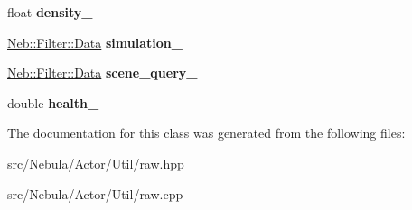 \begin{DoxyCompactItemize}
\item 
\hypertarget{classNeb_1_1Actor_1_1raw_a6f591c6a187022df38c021935f37652b}{float {\bfseries density\-\_\-}}\label{classNeb_1_1Actor_1_1raw_a6f591c6a187022df38c021935f37652b}

\item 
\hypertarget{classNeb_1_1Actor_1_1raw_a98277053503abc934fc98d68695ec5ce}{\hyperlink{classNeb_1_1Filter_1_1Data}{\-Neb\-::\-Filter\-::\-Data} {\bfseries simulation\-\_\-}}\label{classNeb_1_1Actor_1_1raw_a98277053503abc934fc98d68695ec5ce}

\item 
\hypertarget{classNeb_1_1Actor_1_1raw_a10f21229110140a267883a7fc63b5d07}{\hyperlink{classNeb_1_1Filter_1_1Data}{\-Neb\-::\-Filter\-::\-Data} {\bfseries scene\-\_\-query\-\_\-}}\label{classNeb_1_1Actor_1_1raw_a10f21229110140a267883a7fc63b5d07}

\item 
\hypertarget{classNeb_1_1Actor_1_1raw_abb0ceda216754540205cf588df29b9ba}{double {\bfseries health\-\_\-}}\label{classNeb_1_1Actor_1_1raw_abb0ceda216754540205cf588df29b9ba}

\end{DoxyCompactItemize}


\-The documentation for this class was generated from the following files\-:\begin{DoxyCompactItemize}
\item 
src/\-Nebula/\-Actor/\-Util/raw.\-hpp\item 
src/\-Nebula/\-Actor/\-Util/raw.\-cpp\end{DoxyCompactItemize}
